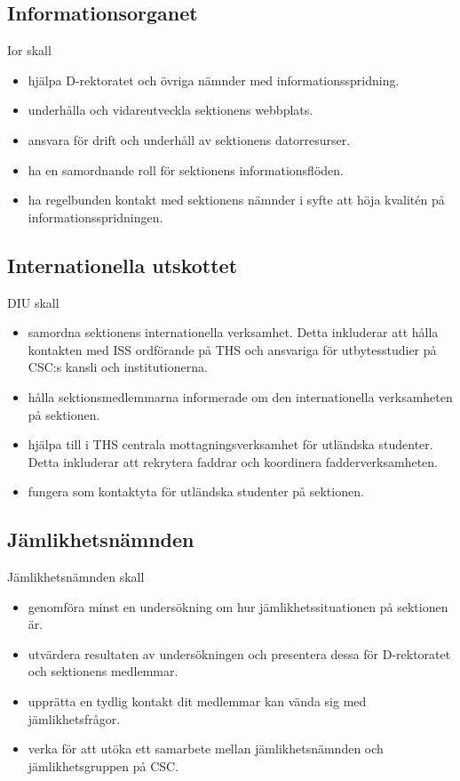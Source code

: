 \documentclass{dgovdoc}
\begin{document}
\subsection{Informationsorganet}

Ior skall

\begin{itemize}
\item hjälpa D-rektoratet och övriga nämnder med informationsspridning.
\item underhålla och vidareutveckla sektionens webbplats.
\item ansvara för drift och underhåll av sektionens datorresurser.
\item ha en samordnande roll för sektionens informationsflöden.
\item ha regelbunden kontakt med sektionens nämnder i syfte att höja kvalitén
  på informationsspridningen.
\end{itemize}

\subsection{Internationella utskottet}

DIU skall

\begin{itemize}
\item samordna sektionens internationella verksamhet. Detta inkluderar att
  hålla kontakten med ISS ordförande på THS och ansvariga för
  utbytesstudier på CSC:s kansli och institutionerna.
\item hålla sektionsmedlemmarna informerade om den internationella verksamheten
  på sektionen.
\item hjälpa till i THS centrala mottagningsverksamhet för utländska studenter.
  Detta inkluderar att rekrytera faddrar och koordinera fadderverksamheten.
\item fungera som kontaktyta för utländska studenter på sektionen.
\end{itemize}

\subsection{Jämlikhetsnämnden}

Jämlikhetsnämnden skall

\begin{itemize}
\item genomföra minst en undersökning om hur jämlikhetssituationen på sektionen
  är.
\item utvärdera resultaten av undersökningen och presentera dessa för
  D-rektoratet och sektionens medlemmar.
\item upprätta en tydlig kontakt dit medlemmar kan vända sig med
  jämlikhetsfrågor.
\item verka för att utöka ett samarbete mellan jämlikhetsnämnden och
  jämlikhetsgruppen på CSC.
\end{itemize}
\end{document}

